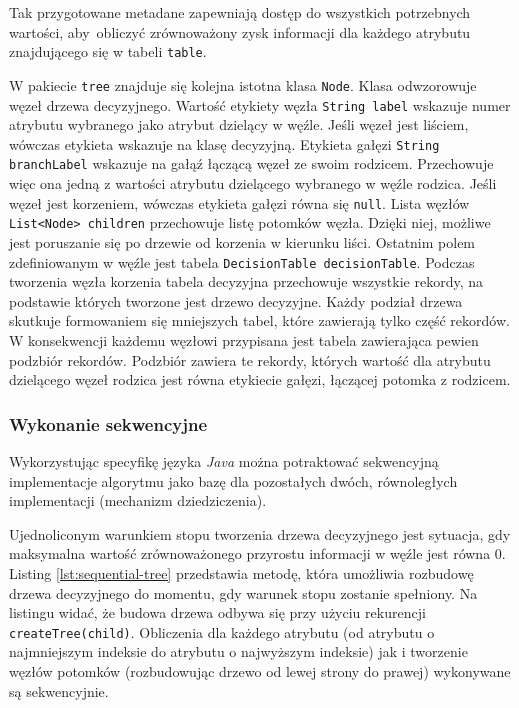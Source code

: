 \documentclass[12pt]{article}
\begin{document}
Tak przygotowane metadane zapewniają dostęp do wszystkich potrzebnych wartości, aby~obliczyć zrównoważony zysk informacji dla każdego
atrybutu znajdującego się w tabeli \verb|table|.

W pakiecie \verb|tree| znajduje się kolejna istotna klasa \verb|Node|. Klasa odwzorowuje węzeł drzewa decyzyjnego.
Wartość etykiety węzła \verb|String label| wskazuje numer atrybutu wybranego jako atrybut dzielący w węźle. Jeśli węzeł jest liściem, wówczas etykieta wskazuje na klasę decyzyjną.
Etykieta gałęzi \verb|String branchLabel| wskazuje na gałąź łączącą węzeł ze swoim rodzicem. Przechowuje więc ona jedną z wartości atrybutu dzielącego wybranego w węźle rodzica.
Jeśli węzeł jest korzeniem, wówczas etykieta gałęzi równa się \verb|null|. Lista węzłów \verb|List<Node> children| przechowuje listę potomków węzła. Dzięki niej, możliwe jest poruszanie się
po drzewie od korzenia w kierunku liści. Ostatnim polem zdefiniowanym w węźle jest tabela \verb|DecisionTable decisionTable|. Podczas tworzenia węzła korzenia tabela decyzyjna przechowuje
wszystkie rekordy, na podstawie których tworzone jest drzewo decyzyjne. Każdy podział drzewa skutkuje formowaniem się mniejszych tabel, które zawierają tylko część rekordów. W konsekwencji
każdemu węzłowi przypisana jest tabela zawierająca pewien podzbiór rekordów. Podzbiór zawiera te rekordy, których wartość dla atrybutu dzielącego węzeł rodzica jest równa etykiecie gałęzi, łączącej
potomka z rodzicem.

\subsubsection{Wykonanie sekwencyjne}
Wykorzystując specyfikę języka \textit{Java} można potraktować sekwencyjną implementacje algorytmu
jako bazę dla pozostałych dwóch, równoległych implementacji (mechanizm dziedziczenia).

Ujednoliconym warunkiem stopu tworzenia drzewa decyzyjnego jest sytuacja, gdy maksymalna wartość zrównoważonego
przyrostu informacji w węźle jest równa 0. Listing \ref{lst:sequential-tree} przedstawia metodę, która
umożliwia rozbudowę drzewa decyzyjnego do momentu, gdy warunek stopu zostanie spełniony. Na listingu widać, że budowa
drzewa odbywa się przy użyciu rekurencji \verb|createTree(child)|.
Obliczenia dla każdego atrybutu (od atrybutu o najmniejszym indeksie do atrybutu o najwyższym indeksie) jak i tworzenie węzłów potomków
(rozbudowując drzewo od lewej strony do prawej) wykonywane są sekwencyjnie. 
\end{document}
